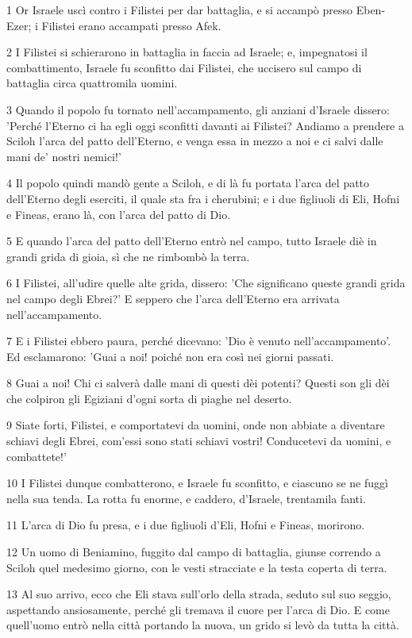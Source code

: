 \par 1 Or Israele uscì contro i Filistei per dar battaglia, e si accampò presso Eben-Ezer; i Filistei erano accampati presso Afek.
\par 2 I Filistei si schierarono in battaglia in faccia ad Israele; e, impegnatosi il combattimento, Israele fu sconfitto dai Filistei, che uccisero sul campo di battaglia circa quattromila uomini.
\par 3 Quando il popolo fu tornato nell'accampamento, gli anziani d'Israele dissero: 'Perché l'Eterno ci ha egli oggi sconfitti davanti ai Filistei? Andiamo a prendere a Sciloh l'arca del patto dell'Eterno, e venga essa in mezzo a noi e ci salvi dalle mani de' nostri nemici!'
\par 4 Il popolo quindi mandò gente a Sciloh, e di là fu portata l'arca del patto dell'Eterno degli eserciti, il quale sta fra i cherubini; e i due figliuoli di Eli, Hofni e Fineas, erano là, con l'arca del patto di Dio.
\par 5 E quando l'arca del patto dell'Eterno entrò nel campo, tutto Israele diè in grandi grida di gioia, sì che ne rimbombò la terra.
\par 6 I Filistei, all'udire quelle alte grida, dissero: 'Che significano queste grandi grida nel campo degli Ebrei?' E seppero che l'arca dell'Eterno era arrivata nell'accampamento.
\par 7 E i Filistei ebbero paura, perché dicevano: 'Dio è venuto nell'accampamento'. Ed esclamarono: 'Guai a noi! poiché non era così nei giorni passati.
\par 8 Guai a noi! Chi ci salverà dalle mani di questi dèi potenti? Questi son gli dèi che colpiron gli Egiziani d'ogni sorta di piaghe nel deserto.
\par 9 Siate forti, Filistei, e comportatevi da uomini, onde non abbiate a diventare schiavi degli Ebrei, com'essi sono stati schiavi vostri! Conducetevi da uomini, e combattete!'
\par 10 I Filistei dunque combatterono, e Israele fu sconfitto, e ciascuno se ne fuggì nella sua tenda. La rotta fu enorme, e caddero, d'Israele, trentamila fanti.
\par 11 L'arca di Dio fu presa, e i due figliuoli d'Eli, Hofni e Fineas, morirono.
\par 12 Un uomo di Beniamino, fuggito dal campo di battaglia, giunse correndo a Sciloh quel medesimo giorno, con le vesti stracciate e la testa coperta di terra.
\par 13 Al suo arrivo, ecco che Eli stava sull'orlo della strada, seduto sul suo seggio, aspettando ansiosamente, perché gli tremava il cuore per l'arca di Dio. E come quell'uomo entrò nella città portando la nuova, un grido si levò da tutta la città.

